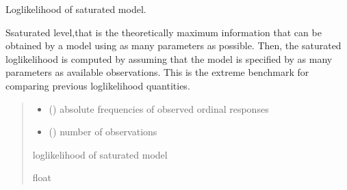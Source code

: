 \documentclass[letterpaper,10pt,english]{sphinxmanual}
\begin{document}
\begin{fulllineitems}
\label{\detokenize{cubmods:cubmods.general.lsat}}
\pysigstartsignatures
{}
\pysigstopsignatures
\sphinxAtStartPar
Log\sphinxhyphen{}likelihood of saturated model.

\sphinxAtStartPar
Ssaturated level,that is the theoretically maximum information
that can be obtained by a model using as many parameters as possible. 
Then, the saturated log\sphinxhyphen{}likelihood is computed by assuming that the model 
is specified by as many parameters as available observations. 
This is the extreme benchmark for comparing
previous log\sphinxhyphen{}likelihood quantities.
\begin{quote}\begin{description}
\begin{itemize}
\item {} 
\sphinxAtStartPar
{} () \textendash{} absolute frequencies of observed ordinal responses

\item {} 
\sphinxAtStartPar
{} () \textendash{} number of observations

\end{itemize}

\sphinxAtStartPar
log\sphinxhyphen{}likelihood of saturated model

\sphinxAtStartPar
float

\end{description}\end{quote}

\end{fulllineitems}

\end{document}
